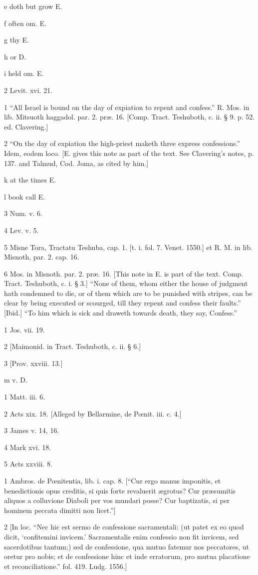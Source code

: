 e
doth but grow E.

f
often om. E.

g
thy E.

h
or D.

i
held om. E.

2
Levit. xvi. 21.

1
“All Israel is bound on the day of expiation to repent and confess.” R. Mos. in lib. Mitsuoth haggadol. par. 2. præ. 16. [Comp. Tract. Teshuboth, c. ii. § 9. p. 52. ed. Clavering.]

2
“On the day of expiation the high-priest maketh three express confessions.” Idem, eodem loco. [E. gives this note as part of the text. See Clavering’s notes, p. 137. and Talmud, Cod. Joma, as cited by him.]

k
at the times E.

l
book call E.

3
Num. v. 6.

4
Lev. v. 5.

5
Misne Tora, Tractatu Teshuba, cap. 1. [t. i. fol. 7. Venet. 1550.] et R. M. in lib. Misnoth, par. 2. cap. 16.

6
Mos. in Misnoth. par. 2. præ. 16. [This note in E. is part of the text. Comp. Tract. Teshuboth, c. i. § 3.] “None of them, whom either the house of judgment hath condemned to die, or of them which are to be punished with stripes, can be clear by being executed or scourged, till they repent and confess their faults.” [Ibid.] “To him which is sick and draweth towards death, they say, Confess.”

1
Jos. vii. 19.

2
[Maimonid. in Tract. Teshuboth, c. ii. § 6.]

3
[Prov. xxviii. 13.]

m
v. D.

1
Matt. iii. 6.

2
Acts xix. 18. [Alleged by Bellarmine, de Pœnit. iii. c. 4.]

3
James v. 14, 16.

4
Mark xvi. 18.

5
Acts xxviii. 8.

1
Ambros. de Pœnitentia, lib. i. cap. 8. [“Cur ergo manus imponitis, et benedictionis opus creditis, si quis forte revaluerit ægrotus? Cur præsumitis aliquos a colluvione Diaboli per vos mundari posse? Cur baptizatis, si per hominem peccata dimitti non licet.”]

2
[In loc. “Nec hic est sermo de confessione sacramentali: (ut patet ex eo quod dicit, ‘confitemini invicem.’ Sacramentalis enim confessio non fit invicem, sed sacerdotibus tantum;) sed de confessione, qua mutuo fatemur nos peccatores, ut oretur pro nobis; et de confessione hinc et inde erratorum, pro mutua placatione et reconciliatione.” fol. 419. Ludg. 1556.]

